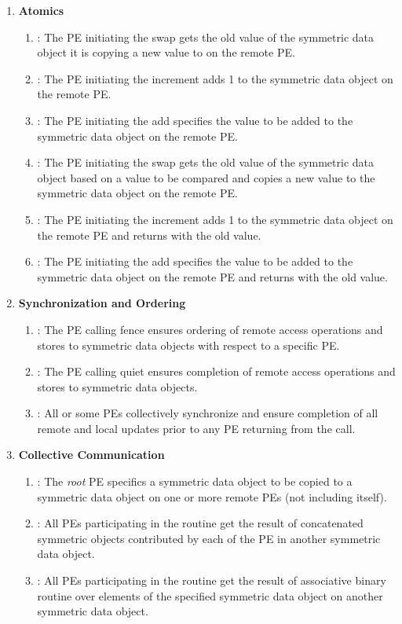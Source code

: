 \begin{enumerate}
\item \textbf{Atomics}
\begin{enumerate}
\item {}: The \ac{PE} initiating the swap gets the old value of the symmetric data object it is copying a new value to on the remote \ac{PE}.
\item {}: The \ac{PE} initiating the increment adds 1 to the symmetric data object on the remote \ac{PE}.
\item {}: The \ac{PE} initiating the add specifies the value to be added to the symmetric data object on the remote \ac{PE}.
\item {}: The \ac{PE} initiating the swap gets the old value of the symmetric data object based on a value to be compared and copies a new value to the symmetric data object on the remote \ac{PE}.
\item {}: The \ac{PE} initiating the increment adds 1 to the symmetric data object on the remote \ac{PE} and returns with the old value.
\item {}: The \ac{PE} initiating the add specifies the value to be added to the symmetric data object on the remote \ac{PE} and returns with the old value.
\end{enumerate}

\item \textbf{Synchronization and Ordering}
\begin{enumerate}
\item {}: The \ac{PE} calling fence ensures ordering of remote access operations and stores to symmetric data objects with respect to a specific \dest{} \ac{PE}. 
\item {}: The \ac{PE} calling quiet ensures completion of remote access operations and stores to symmetric data objects. 
\item {}: All or some \ac{PE}s collectively synchronize and ensure completion of all remote and local updates prior to any \ac{PE} returning from the call.
\end{enumerate}

\item \textbf{Collective Communication}
\begin{enumerate}
\item {}: The \textit{root} \ac{PE} specifics a symmetric data object to be copied to a symmetric data object on one or more remote \ac{PE}s (not including itself). 
\item {}: All \ac{PE}s participating in the routine get the result of concatenated symmetric objects contributed by each of the \ac{PE} in another symmetric data object.
\item {}: All \ac{PE}s participating in the routine get the result of associative binary routine over elements of the specified symmetric data object on another symmetric data object. 
\end{enumerate}


\end{enumerate}
